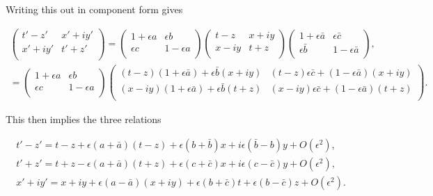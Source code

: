 \noindent Writing this out in component form gives

\begin{align*}
\left(
\begin{array}{cc}
t'-z' & x' + iy' \\
x' + iy' & t'+z' \\
\end{array}
\right)
=
\left(
\begin{array}{cc}
1 + \epsilon a & \epsilon b \\
\epsilon c & 1 - \epsilon a \\
\end{array}
\right)
\left(
\begin{array}{cc}
t-z & x + iy \\
x - iy & t+z \\
\end{array}
\right)
\left(
\begin{array}{cc}
1 + \epsilon  \bar{a} & \epsilon \bar{c} \\
\epsilon \bar{b} & 1 - \epsilon \bar{a} \\
\end{array}
\right), \\
=
\left(
\begin{array}{cc}
1 + \epsilon a & \epsilon b \\
\epsilon c & 1 - \epsilon a \\
\end{array}
\right)
\left(
\begin{array}{cc}
(t-z)(1 + \epsilon \bar{a})+\epsilon \bar{b}(x + iy) & (t-z)\epsilon \bar{c}+ (1 - \epsilon \bar{a})(x + iy) \\
(x - iy)(1 + \epsilon \bar{a}) +\epsilon \bar{b} (t+z) & (x - iy)\epsilon \bar{c}+(1 - \epsilon \bar{a})(t+z) \\
\end{array}
\right).
\end{align*}

\noindent This then implies the three relations

\begin{eqnarray}\label{Infinitesimal_Lorentz_Transform_1}
t'-z' = t-z + \epsilon(a + \bar{a})(t-z) + \epsilon(b + \bar{b})x + i\epsilon(\bar{b} - b)y + O(\epsilon^2), \\\label{Infinitesimal_Lorentz_Transform_2}
t'+z' = t+ z - \epsilon(a + \bar{a})(t+z) + \epsilon (c + \bar{c})x + i \epsilon(c-\bar{c})y + O(\epsilon^2), \\\label{Infinitesimal_Lorentz_Transform_3}
x'+iy' = x+iy + \epsilon(a-\bar{a})(x+iy) + \epsilon(b + \bar{c})t + \epsilon (b-\bar{c})z + O(\epsilon^2).
\end{eqnarray}

